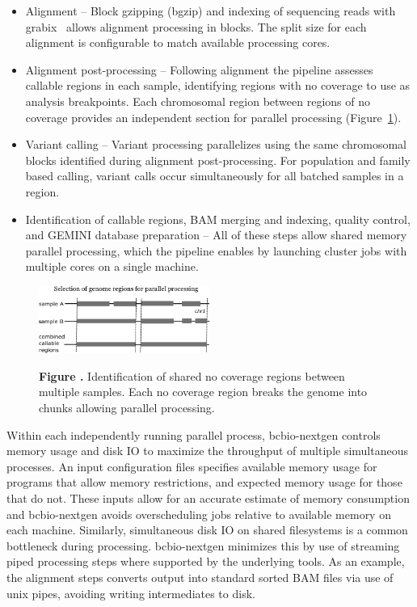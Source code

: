 \documentclass{frontiersSCNS}
\begin{document}
\begin{itemize}
  \item Alignment -- Block gzipping (bgzip) and indexing of sequencing reads with
    grabix~\citep{grabix} allows alignment processing in blocks. The split size
    for each alignment is configurable to match available processing cores.
  \item Alignment post-processing -- Following alignment the pipeline assesses
    callable regions in each sample, identifying regions with no coverage to use
    as analysis breakpoints. Each chromosomal region between regions of no coverage
    provides an independent section for parallel processing (Figure~\ref{fig:03}).
  \item Variant calling -- Variant processing parallelizes using the same
    chromosomal blocks identified during alignment post-processing. For
    population and family based calling, variant calls occur simultaneously for
    all batched samples in a region.
  \item Identification of callable regions, BAM merging and indexing, quality
    control, and GEMINI database preparation -- All of these steps allow shared
    memory parallel processing, which the pipeline enables by launching cluster
    jobs with multiple cores on a single machine.
\end{itemize}

\begin{figure}[tbp]
\begin{center}
\includegraphics[width=0.5\textwidth]{parallel-genome}
\end{center}
 \textbf{\label{fig:03} Figure .}{
   Identification of shared no coverage regions between multiple samples. Each
   no coverage region breaks the genome into chunks allowing parallel processing.}
\end{figure}

Within each independently running parallel process, bcbio-nextgen controls
memory usage and disk IO to maximize the throughput of multiple simultaneous
processes.  An input configuration files specifies available memory usage for
programs that allow memory restrictions, and expected memory usage for those
that do not. These inputs allow for an accurate estimate of memory consumption and
bcbio-nextgen avoids overscheduling jobs relative to available memory on each
machine. Similarly, simultaneous disk IO on shared filesystems is a common
bottleneck during processing. bcbio-nextgen minimizes this by use of streaming
piped processing steps where supported by the underlying tools. As an example,
the alignment steps converts output into standard sorted BAM files via use of
unix pipes, avoiding writing intermediates to disk.
\end{document}
